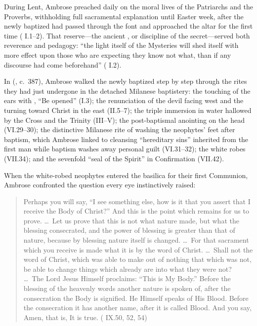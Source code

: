 During Lent, Ambrose preached daily on the moral lives of the Patriarchs and the Proverbs, withholding full sacramental explanation until Easter week, after the newly baptized had passed through the font and approached the altar for the first time ( I.1--2). That reserve---the ancient , or discipline of the secret---served both reverence and pedagogy: ``the light itself of the Mysteries will shed itself with more effect upon those who are expecting they know not what, than if any discourse had come beforehand'' ( I.2).

In  (, c.~387), Ambrose walked the newly baptized step by step through the rites they had just undergone in the detached Milanese baptistery: the touching of the ears with , ``Be opened'' (I.3); the renunciation of the devil facing west and the turning toward Christ in the east (II.5--7); the triple immersion in water hallowed by the Cross and the Trinity (III--V); the post-baptismal anointing on the head (VI.29--30); the distinctive Milanese rite of washing the neophytes' feet after baptism, which Ambrose linked to cleansing ``hereditary sins'' inherited from the first man while baptism washes away personal guilt (VI.31--32); the white robes (VII.34); and the sevenfold ``seal of the Spirit'' in Confirmation (VII.42).

When the white-robed neophytes entered the basilica for their first Communion, Ambrose confronted the question every eye instinctively raised:

\begin{quote}
Perhaps you will say, ``I see something else, how is it that you assert that I receive the Body of Christ?'' And this is the point which remains for us to prove. \ldots\ Let us prove that this is not what nature made, but what the blessing consecrated, and the power of blessing is greater than that of nature, because by blessing nature itself is changed. \ldots\ For that sacrament which you receive is made what it is by the word of Christ. \ldots\ Shall not the word of Christ, which was able to make out of nothing that which was not, be able to change things which already are into what they were not? \ldots\ The Lord Jesus Himself proclaims: ``This is My Body.'' Before the blessing of the heavenly words another nature is spoken of, after the consecration the Body is signified. He Himself speaks of His Blood. Before the consecration it has another name, after it is called Blood. And you say, Amen, that is, It is true. ( IX.50, 52, 54)
\end{quote}

